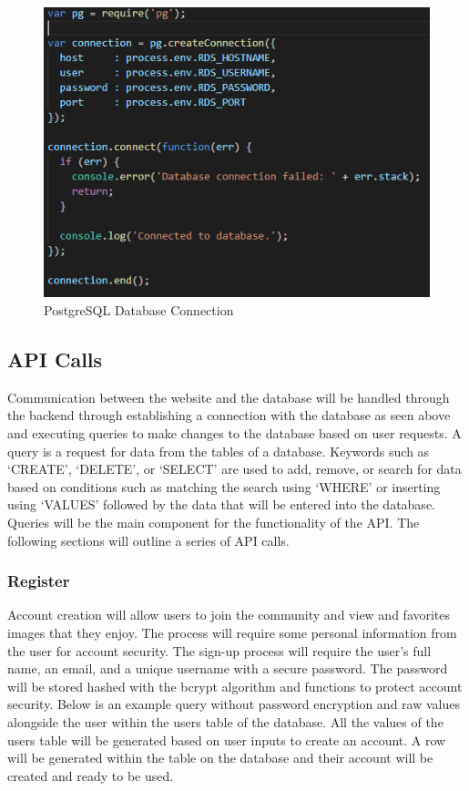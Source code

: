 \documentclass[12pt]{article}
\begin{document}
\begin{figure}[h]
	\centering
	\includegraphics[scale=0.5]{database_connection}
	\caption{PostgreSQL Database Connection}
\end{figure}

\subsection{API Calls}

Communication between the website and the database will be handled through the backend through establishing a connection with the database as seen above and executing queries to make changes to the database based on user requests.  A query is a request for data from the tables of a database.  Keywords such as ‘CREATE’, ‘DELETE’, or ‘SELECT’ are used to add, remove, or search for data based on conditions such as matching the search using ‘WHERE’ or inserting using ‘VALUES’ followed by the data that will be entered into the database.  Queries will be the main component for the functionality of the API.  The following sections will outline a series of API calls.

\subsubsection{Register}

Account creation will allow users to join the community and view and favorites images that they enjoy.  The process will require some personal information from the user for account security.  The sign-up process will require the user’s full name, an email, and a unique username with a secure password.  The password will be stored hashed with the bcrypt algorithm and functions to protect account security.  Below is an example query without password encryption and raw values alongside the user within the users table of the database.  All the values of the users table will be generated based on user inputs to create an account.  A row will be generated within the table on the database and their account will be created and ready to be used.
\end{document}
